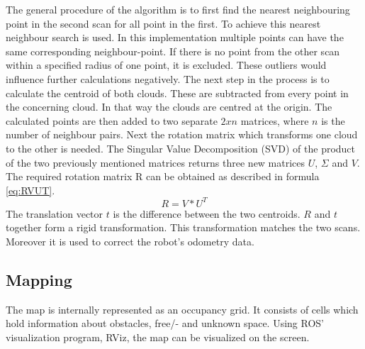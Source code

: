 \documentclass{ba-kecs}
\begin{document}
The general procedure of the algorithm is to first find the nearest neighbouring point in the second scan for all point in the first. To achieve this nearest neighbour search is used.
In this implementation multiple points can have the same corresponding neighbour-point. If there is no point from the other scan within a specified radius of one point, it is excluded. These outliers would influence further calculations negatively.
The next step in the process is to calculate the centroid of both clouds. These are subtracted from every point in the concerning cloud. In that way the clouds are centred at the origin. The calculated points are then added to two separate $2xn$ matrices, where $n$ is the number of neighbour pairs. Next the rotation matrix which transforms one cloud to the other is needed. The Singular Value Decomposition (SVD) of the product of the two previously mentioned matrices returns three new matrices $U$, $\Sigma$ and $V$. The required rotation matrix R can be obtained as described in formula \ref{eq:RVUT}.
\begin{equation}
\label{eq:RVUT}
 R = V * U^T
\end{equation}
The translation vector $t$ is the difference between the two centroids. $R$ and $t$ together form a rigid transformation. This transformation matches the two scans. Moreover it is used to correct the robot's odometry data.

\subsection{Mapping}\label{sec:mapping}

The map is internally represented as an occupancy grid. It consists of cells which hold information about obstacles, free/- and unknown space. Using ROS' visualization program, RViz, the map can be visualized on the screen.
\end{document}
